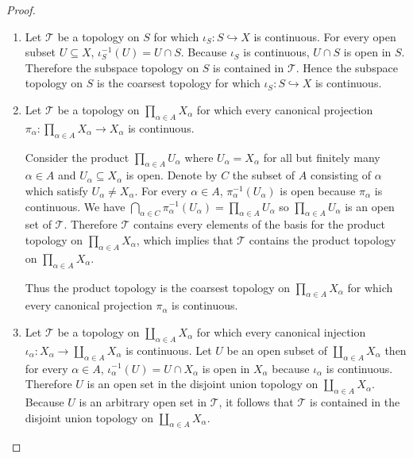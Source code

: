 \begin{proof}
    \begin{enumerate}[label={(\alph*)}]
        \item Let $\mathscr{T}$ be a topology on $S$ for which $\iota_{S}: S\hookrightarrow{} X$ is continuous. For every open subset $U\subseteq X$, $\iota_{S}^{-1}(U) = U\cap S$. Because $\iota_{S}$ is continuous, $U\cap S$ is open in $S$. Therefore the subspace topology on $S$ is contained in $\mathscr{T}$. Hence the subspace topology on $S$ is the coarsest topology for which $\iota_{S}: S\hookrightarrow{} X$ is continuous.
        \item Let $\mathscr{T}$ be a topology on $\prod_{\alpha\in A}X_{\alpha}$ for which every canonical projection $\pi_{\alpha}: \prod_{\alpha\in A}X_{\alpha} \to X_{\alpha}$ is continuous.

              Consider the product $\prod_{\alpha\in A}U_{\alpha}$ where $U_{\alpha} = X_{\alpha}$ for all but finitely many $\alpha\in A$ and $U_{\alpha}\subseteq X_{\alpha}$ is open. Denote by $C$ the subset of $A$ consisting of $\alpha$ which satisfy $U_{\alpha}\ne X_{\alpha}$. For every $\alpha\in A$, $\pi_{\alpha}^{-1}(U_{\alpha})$ is open because $\pi_{\alpha}$ is continuous. We have $\bigcap_{\alpha\in C}\pi_{\alpha}^{-1}(U_{\alpha}) = \prod_{\alpha\in A}U_{\alpha}$ so $\prod_{\alpha\in A}U_{\alpha}$ is an open set of $\mathscr{T}$. Therefore $\mathscr{T}$ contains every elements of the basis for the product topology on $\prod_{\alpha\in A}X_{\alpha}$, which implies that $\mathscr{T}$ contains the product topology on $\prod_{\alpha\in A}X_{\alpha}$.

              Thus the product topology is the coarsest topology on $\prod_{\alpha\in A}X_{\alpha}$ for which every canonical projection $\pi_{\alpha}$ is continuous.
        \item Let $\mathscr{T}$ be a topology on $\coprod_{\alpha\in A}X_{\alpha}$ for which every canonical injection $\iota_{\alpha}: X_{\alpha}\to \coprod_{\alpha\in A}X_{\alpha}$ is continuous. Let $U$ be an open subset of $\coprod_{\alpha\in A}X_{\alpha}$ then for every $\alpha\in A$, $\iota_{\alpha}^{-1}(U) = U\cap X_{\alpha}$ is open in $X_{\alpha}$ because $\iota_{\alpha}$ is continuous. Therefore $U$ is an open set in the disjoint union topology on $\coprod_{\alpha\in A}X_{\alpha}$. Because $U$ is an arbitrary open set in $\mathscr{T}$, it follows that $\mathscr{T}$ is contained in the disjoint union topology on $\coprod_{\alpha\in A}X_{\alpha}$.


\end{enumerate}
\end{proof}
